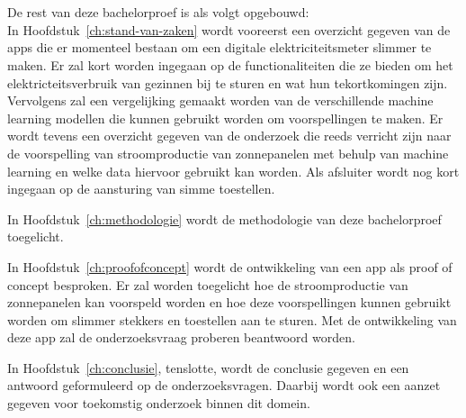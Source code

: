 \section{}%
\label{sec:opzet-bachelorproef}


De rest van deze bachelorproef is als volgt opgebouwd: \\

In Hoofdstuk~\ref{ch:stand-van-zaken} wordt vooreerst een overzicht gegeven van de apps die er momenteel bestaan om een digitale elektriciteitsmeter slimmer te maken. Er zal kort worden ingegaan op de functionaliteiten die ze bieden om het elektricteitsverbruik van gezinnen bij te sturen en wat hun tekortkomingen zijn. Vervolgens zal een vergelijking gemaakt worden van de verschillende machine learning modellen die kunnen gebruikt worden om voorspellingen te maken. Er wordt tevens een overzicht gegeven van de onderzoek die reeds verricht zijn naar de voorspelling van stroomproductie van zonnepanelen met behulp van machine learning en welke data hiervoor gebruikt kan worden. Als afsluiter wordt nog kort ingegaan op de aansturing van simme toestellen.

In Hoofdstuk~\ref{ch:methodologie} wordt de methodologie van deze bachelorproef toegelicht.

In Hoofdstuk~\ref{ch:proofofconcept} wordt de ontwikkeling van een app als proof of concept besproken. Er zal worden toegelicht hoe de stroomproductie van zonnepanelen kan voorspeld worden en hoe deze voorspellingen kunnen gebruikt worden om slimmer stekkers en toestellen aan te sturen. Met de ontwikkeling van deze app zal de onderzoeksvraag proberen beantwoord worden.


In Hoofdstuk~\ref{ch:conclusie}, tenslotte, wordt de conclusie gegeven en een antwoord geformuleerd op de onderzoeksvragen. Daarbij wordt ook een aanzet gegeven voor toekomstig onderzoek binnen dit domein.